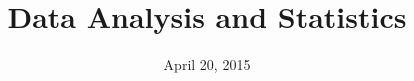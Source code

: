 


% 



\newcommand{\Y}{{\tikz\draw[black,fill=yellow] (0,0) circle (1ex);}\xspace}
\newcommand{\G}{{\tikz\draw[black,fill=green] (0,0) circle (1ex);}\xspace}

\title[Statistics]{Data Analysis and Statistics}
\date{April 20, 2015}



\begin{noheadline}
\maketitle
\end{noheadline}


